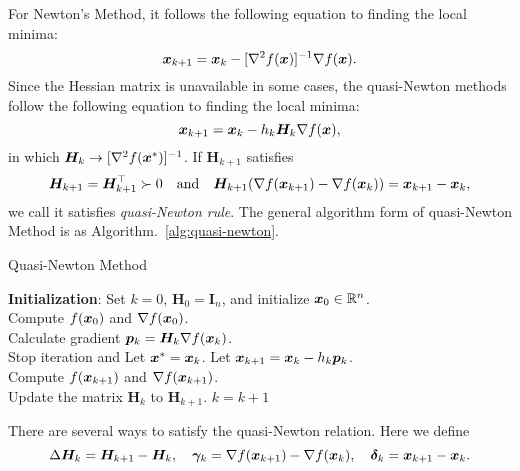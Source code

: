 For Newton's Method, it follows the following equation to finding the local minima:
\[
    \bm{x}_{k+1} = \bm{x}_k - [\nabla^2 f(\bm{x})]^{-1} \nabla f(\bm{x}).  
\]
Since the Hessian matrix is unavailable in some cases, the quasi-Newton methods follow the following equation to finding the local minima:
\[
    \bm{x}_{k+1} = \bm{x}_k - h_k \bm{H}_k \nabla f(\bm{x}),
\]
in which \(\bm{H}_k \to [\nabla^2 f(\bm{x}^*)]^{-1}\). If \(\bm{H}_{k+1}\) satisfies
\[
    \bm{H}_{k+1} = \bm{H}_{k+1}^\top \succ 0 \quad \text{and} \quad 
    \bm{H}_{k+1}(\nabla f(\bm{x}_{k+1}) - \nabla f(\bm{x}_{k})) = \bm{x}_{k+1} - \bm{x}_k,
\]
we call it satisfies \emph{quasi-Newton rule}. The general algorithm form of quasi-Newton Method is as Algorithm.~\ref{alg:quasi-newton}.

\begin{algorithm}[!htbp]
    \caption{Quasi-Newton Method}\label{alg:quasi-newton}
    \textbf{Initialization}: Set \(k = 0\), \(\bm{H}_0 = \bm{I}_n\), and initialize \(\bm{x}_0 \in \mathbb{R}^n\). \\
    Compute \(f(\bm{x}_0)\) and \(\nabla f(\bm{x}_0)\).\\
     {
        Calculate gradient \(\bm{p}_k = \bm{H}_k \nabla f(\bm{x}_k)\).\\
         {
            Stop iteration and Let \(\bm{x}^* = \bm{x}_k\).
        }{
            Let \(\bm{x}_{k+1} = \bm{x}_k - h_k \bm{p}_k\). \\
            Compute \(f(\bm{x}_{k+1})\) and \(\nabla f(\bm{x}_{k+1})\). \\
            Update the matrix \(\bm{H}_k\) to \(\bm{H}_{k+1}\).
        }
        \(k = k+1\)
    }
\end{algorithm}

There are several ways to satisfy the quasi-Newton relation. Here we define 
\[
    \Delta \bm{H}_k = \bm{H}_{k+1} - \bm{H}_k, \quad \bm{\gamma}_k = \nabla f(\bm{x}_{k+1}) - \nabla f(\bm{x}_k), \quad \bm{\delta}_k = \bm{x}_{k+1} - \bm{x}_k.  
\]

